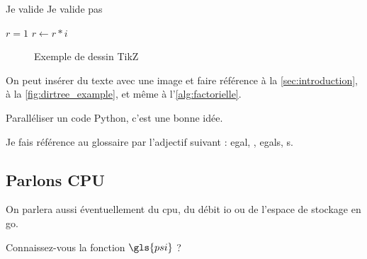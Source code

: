 

\begin{algorithm}[H]
%
\caption{Connaître sa validation}\label{alg:validation}
\SetAlgoLined
{}
%
{
	Je valide\;
}
\Else
{
	Je valide pas\;
}
%
\end{algorithm}


\begin{algorithm}[H]
%
\caption{Factorielle de $n$}\label{alg:factorielle}
\SetAlgoLined
%
\Begin
{
    $r = 1$\;
    {
        $r \leftarrow r*i$\;
    }
}
%
\end{algorithm}






\newpage
\begin{figure}[!h]
\begin{center}
\resizebox{\textwidth}{!}{%

}%
\caption{Exemple de dessin TikZ}
\label{fig:dummy}
\end{center}
\end{figure}

On peut insérer du texte avec une image  et faire référence à la \autoref{sec:introduction}, à la \autoref{fig:dirtree_example}, et même à l'\autoref{alg:factorielle}.

Paralléliser un code Python, c'est une bonne idée. \cite{mpi4py}

Je fais référence au glossaire par l'adjectif suivant : \gls{egal}, , \glspl{egal}, s.


\subsection{Parlons CPU}\label{ssec:dummy_cpu}

On parlera aussi éventuellement du \gls{cpu}, du débit \acs{io} ou de l'espace de stockage en \acl{go}.

Connaissez-vous la fonction \( \gls{psi} \) ?

